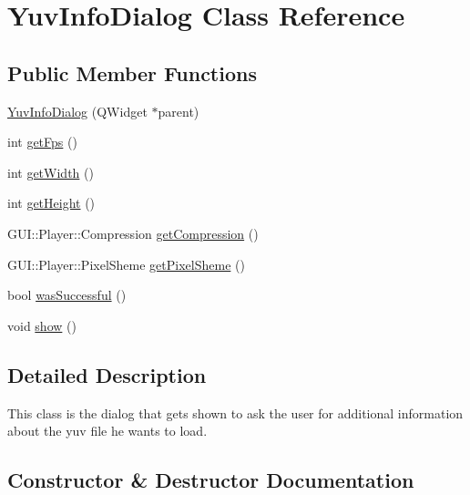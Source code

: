 \hypertarget{classGUI_1_1Player_1_1YuvInfoDialog}{}\section{Yuv\+Info\+Dialog Class Reference}
\label{classGUI_1_1Player_1_1YuvInfoDialog}
\subsection*{Public Member Functions}
\begin{DoxyCompactItemize}
\item 
\hyperlink{classGUI_1_1Player_1_1YuvInfoDialog_a622c0bd69a1aa5f6d1ab806cf2041249}{Yuv\+Info\+Dialog} (Q\+Widget $\ast$parent)
\item 
int \hyperlink{classGUI_1_1Player_1_1YuvInfoDialog_a519ad5c0664b9de28c1a6d9dc77f959d}{get\+Fps} ()
\item 
int \hyperlink{classGUI_1_1Player_1_1YuvInfoDialog_a67a0997183f24da19b776d96c1052998}{get\+Width} ()
\item 
int \hyperlink{classGUI_1_1Player_1_1YuvInfoDialog_a07efb2a4e9a982688c8bb3c3f21d1092}{get\+Height} ()
\item 
G\+U\+I\+::\+Player\+::\+Compression \hyperlink{classGUI_1_1Player_1_1YuvInfoDialog_a139617717a18c742c6a9e3183f815903}{get\+Compression} ()
\item 
G\+U\+I\+::\+Player\+::\+Pixel\+Sheme \hyperlink{classGUI_1_1Player_1_1YuvInfoDialog_a1a60961a134cca971594bbeff8a60ebe}{get\+Pixel\+Sheme} ()
\item 
bool \hyperlink{classGUI_1_1Player_1_1YuvInfoDialog_a6677ab283cdae9435a6be93d9c3481b2}{was\+Successful} ()
\item 
void \hyperlink{classGUI_1_1Player_1_1YuvInfoDialog_a4b148f40a95444d5669406b918ad2f52}{show} ()
\end{DoxyCompactItemize}


\subsection{Detailed Description}
This class is the dialog that gets shown to ask the user for additional information about the yuv file he wants to load. 

\subsection{Constructor \& Destructor Documentation}
\hypertarget{classGUI_1_1Player_1_1YuvInfoDialog_a622c0bd69a1aa5f6d1ab806cf2041249}{}
